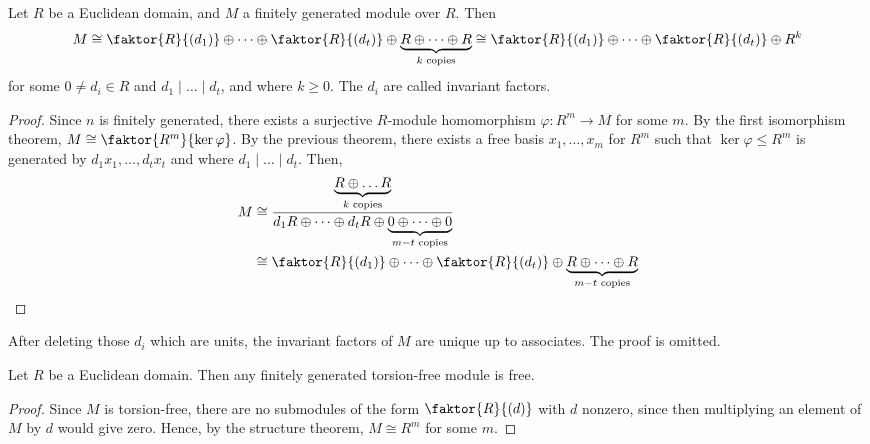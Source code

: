 \begin{theorem}
	Let $R$ be a Euclidean domain, and $M$ a finitely generated module over $R$.
	Then
	\begin{align*}
		M \cong \faktor{R}{(d_1)} \oplus \dots \oplus \faktor{R}{(d_t)} \oplus \underbrace{R \oplus \dots \oplus R}_{k \text{ copies}} \cong \faktor{R}{(d_1)} \oplus \dots \oplus \faktor{R}{(d_t)} \oplus R^k
	\end{align*}
	for some $0 \neq d_i \in R$ and $d_1 \mid \dots \mid d_t$, and where $k \geq 0$.
	The $d_i$ are called invariant factors.
\end{theorem}
\begin{proof}
	Since $n$ is finitely generated, there exists a surjective $R$-module homomorphism $\varphi \colon R^m \to M$ for some $m$.
	By the first isomorphism theorem, $M \cong \faktor{R^m}{\ker \varphi}$.
	By the previous theorem, there exists a free basis $x_1, \dots, x_m$ for $R^m$ such that $\ker \varphi \leq R^m$ is generated by $d_1 x_1, \dots, d_t x_t$ and where $d_1 \mid \dots \mid d_t$.
	Then,
	\begin{align*}
		M & \cong \frac{\underbrace{R \oplus \dots R}_{k \text{ copies}}}{d_1 R \oplus \dots \oplus d_t R \oplus \underbrace{0 \oplus \dots \oplus 0}_{m-t \text{ copies}}} \\
		  & \cong \faktor{R}{(d_1)} \oplus \dots \oplus \faktor{R}{(d_t)} \oplus \underbrace{R \oplus \dots \oplus R}_{m-t \text{ copies}}
	\end{align*}
\end{proof}
\begin{remark}
	After deleting those $d_i$ which are units, the invariant factors of $M$ are unique up to associates.
	The proof is omitted.
\end{remark}
\begin{corollary}
	Let $R$ be a Euclidean domain.
	Then any finitely generated torsion-free module is free.
\end{corollary}
\begin{proof}
	Since $M$ is torsion-free, there are no submodules of the form $\faktor{R}{(d)}$ with $d$ nonzero, since then multiplying an element of $M$ by $d$ would give zero.
	Hence, by the structure theorem, $M \cong R^m$ for some $m$.
\end{proof}

